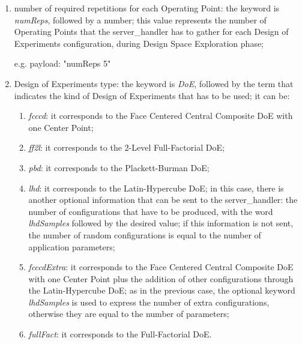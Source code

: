 \begin{enumerate}

    \item number of required repetitions for each Operating Point: the keyword is \textit{numReps}, followed by a number; this value represents the number of Operating Points that the server\_handler has to gather for each Design of Experiments configuration, during Design Space Exploration phase;
    
    e.g. payload: "numReps 5"
    
    \item Design of Experiments type: the keyword is \textit{DoE}, followed by the term that indicates the kind of Design of Experiments that has to be used; it can be:
    
    \begin{enumerate}
    
        \item \textit{fcccd}: it corresponds to the Face Centered Central Composite DoE with one Center Point;
        
        \item \textit{ff2l}: it corresponds to the 2-Level Full-Factorial DoE;
        
        \item \textit{pbd}: it corresponds to the Plackett-Burman DoE;
        
        \item \textit{lhd}: it corresponds to the Latin-Hypercube DoE; in this case, there is another optional information that can be sent to the server\_handler: the number of configurations that have to be produced, with the word \textit{lhdSamples} followed by the desired value; if this information is not sent, the number of random configurations is equal to the number of application parameters;
        
        \item \textit{fcccdExtra}: it corresponds to the Face Centered Central Composite DoE with one Center Point plus the addition of other configurations through the Latin-Hypercube DoE; as in the previous case, the optional keyword \textit{lhdSamples} is used to express the number of extra configurations, otherwise they are equal to the number of parameters;
        
        \item \textit{fullFact}: it corresponds to the Full-Factorial DoE.
    
    \end{enumerate}
    

\end{enumerate}
